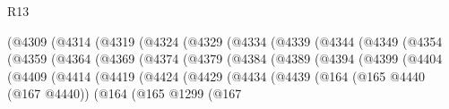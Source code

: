 \begin{lexlean}{R13}
\begin{coremodule}
                                  (@4309
                                    (@4314
                                      (@4319
                                        (@4324
                                          (@4329
                                            (@4334
                                              (@4339
                                                (@4344
                                                  (@4349
                                                    (@4354
                                                      (@4359
                                                        (@4364
                                                          (@4369
                                                            (@4374
                                                              (@4379
                                                                (@4384
                                                                  (@4389
                                                                    (@4394
                                                                      (@4399
                                                                        (@4404
                                                                          (@4409
                                                                            (@4414
                                                                              (@4419
                                                                                (@4424
                                                                                  (@4429
                                                                                    (@4434
                                                                                      (@4439
                                                                                        (@164
                                                                                          (@165
                                                                                            @4440
                                                                                            (@167
                                                                                              @4440))
                                                                                          (@164
                                                                                            (@165
                                                                                              @1299
                                                                                              (@167

\end{coremodule}
\end{lexlean}
